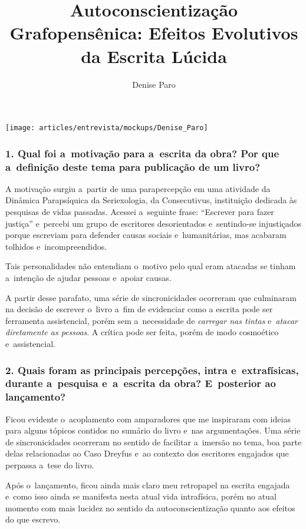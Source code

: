 \documentclass{gescons}
\author{Denise Paro}
\title{Autoconscientização Grafopensênica: Efeitos Evolutivos da Escrita Lúcida}
\begin{document}
    \makeentrevistatitle

    \begin{multicols}{2}

\begin{center}
    \texttt{[image: articles/entrevista/mockups/Denise\_Paro]}
\end{center}

\subsubsection{1. Qual foi a~motivação para a~escrita da obra? Por que a~definição deste tema para publicação de um livro?}

A motivação surgiu a~partir de uma parapercepção em uma atividade da
Dinâmica Parapsíquica da Seriexologia, da Consecutivus, instituição
dedicada às pesquisas de vidas passadas. Acessei a~seguinte frase:
``Escrever para fazer justiça'' e~percebi um grupo de escritores
desorientados e~sentindo-se injustiçados porque escreviam para defender
causas sociais e~humanitárias, mas acabaram tolhidos e~incompreendidos.

Tais personalidades não entendiam o~motivo pelo qual eram atacadas se
tinham a~intenção de ajudar pessoas e~apoiar causas.

A partir desse parafato, uma série de sincronicidades ocorreram que
culminaram na decisão de escrever o~livro a~fim de evidenciar como a
escrita pode ser ferramenta assistencial, porém sem a~necessidade de
\emph{carregar nas tintas} e~\emph{atacar diretamente as pessoas}. A
crítica pode ser feita, porém de modo cosmoético e~assistencial.

\subsubsection{2. Quais foram as principais percepções, intra e~extrafísicas, durante a~pesquisa e~a~escrita da obra? E~posterior ao lançamento?}

Ficou evidente o~acoplamento com amparadores que me inspiraram com
ideias para alguns tópicos contidos no sumário do livro e~nas
argumentações. Uma série de sincronicidades ocorreram no sentido de
facilitar a~imersão no tema, boa parte delas relacionadas ao Caso
Dreyfus e~ao contexto dos escritores engajados que perpassa a~tese do
livro.

Após o~lançamento, ficou ainda mais claro meu retropapel na escrita
engajada e~como isso ainda se manifesta nesta atual vida intrafísica,
porém no atual momento com mais lucidez no sentido da
autoconscientização quanto aos efeitos do que escrevo.


\end{multicols}
\end{document}
